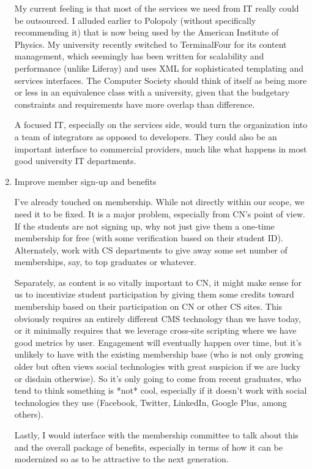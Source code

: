 \documentclass[11pt,english]{luclet}
\begin{document}
\begin{enumerate}
  My current feeling is that most of the services we need from IT really
  could be outsourced. I alluded earlier to Polopoly (without
  specifically recommending it) that is now being used by the American
  Institute of Physics. My university recently switched to TerminalFour
  for its content management, which seemingly has been written for
  scalability and performance (unlike Liferay) and uses XML for
  sophisticated templating and services interfaces. The Computer Society
  should think of itself as being more or less in an equivalence class
  with a university, given that the budgetary constraints and
  requirements have more overlap than difference.

  A focused IT, especially on the services side, would turn the
  organization into a team of integrators as opposed to developers. They
  could also be an important interface to commercial providers, much
  like what happens in most good university IT departments.

\item  Improve member sign-up and benefits

  I've already touched on membership. While not directly within our
  scope, we need it to be fixed. It is a major problem, especially from
  CN's point of view. If the students are not signing up, why not just
  give them a one-time membership for free (with some verification based
  on their student ID). Alternately, work with CS departments to give
  away some set number of memberships, say, to top graduates or
  whatever.

  Separately, as content is so vitally important to CN, it might make
  sense for us to incentivize student participation by giving them some
  credits toward membership based on their participation on CN or other
  CS sites.  This obviously requires an entirely different CMS
  technology than we have today, or it minimally requires that we
  leverage cross-site scripting where we have good metrics by
  user. Engagement will eventually happen over time, but it's unlikely
  to have with the existing membership base (who is not only growing
  older but often views social technologies with great suspicion if we
  are lucky or disdain otherwise). So it's only going to come from
  recent graduates, who tend to think something is *not* cool,
  especially if it doesn't work with social technologies they use
  (Facebook, Twitter, LinkedIn, Google Plus, among others).

  Lastly, I would interface with the membership committee to talk about
  this and the overall package of benefits, especially in terms of how
  it can be modernized so as to be attractive to the next generation.

\end{enumerate}
\end{document}
